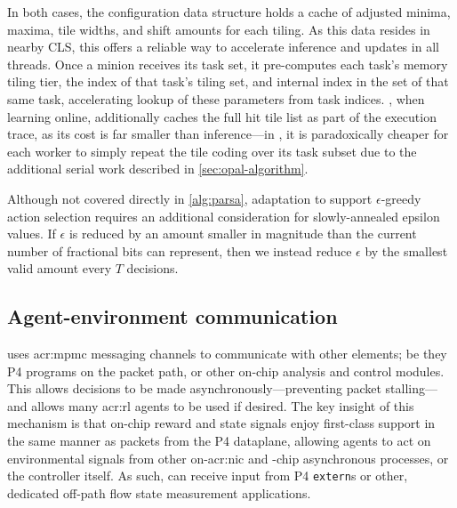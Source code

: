 In both cases, the configuration data structure holds a cache of adjusted minima, maxima, tile widths, and shift amounts for each tiling.
As this data resides in nearby CLS, this offers a reliable way to accelerate inference and updates in all \approachshort{} threads.
Once a \coopfw{} minion receives its task set, it pre-computes each task's memory tiling tier, the index of that task's tiling set, and internal index in the set of that same task, accelerating lookup of these parameters from task indices.
\Indfw{}, when learning online, additionally caches the full hit tile list as part of the execution trace, as its cost is far smaller than inference---in \Coopfw, it is paradoxically cheaper for each worker to simply repeat the tile coding over its task subset due to the additional serial work described in \cref{sec:opal-algorithm}.

Although not covered directly in \cref{alg:parsa}, adaptation to support $\epsilon$-greedy action selection requires an additional consideration for slowly-annealed epsilon values.
If $\epsilon$ is reduced by an amount smaller in magnitude than the current number of fractional bits can represent, then we instead reduce $\epsilon$ by the smallest valid amount every $T$ decisions.


\subsection{Agent-environment communication}\label{sec:agent-environment-communication}
\approachshort{} uses \gls{acr:mpmc} messaging channels to communicate with other elements; be they P4 programs on the packet path, or other on-chip analysis and control modules.
This allows decisions to be made asynchronously---preventing packet stalling---and allows many \gls{acr:rl} agents to be used if desired.
The key insight of this mechanism is that on-chip reward and state signals enjoy first-class support in the same manner as packets from the P4 dataplane, allowing agents to act on environmental signals from other on-\gls{acr:nic} and -chip asynchronous processes, or the controller itself.
As such, \approachshort{} can receive input from P4 \texttt{extern}s or other, dedicated off-path flow state measurement applications.

